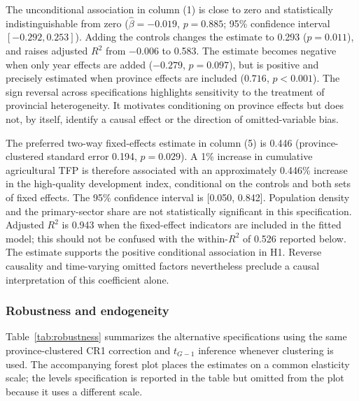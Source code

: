 \documentclass[sustainability,article,submit,moreauthors]{Definitions/mdpi}
\numberwithin{equation}{section}
\begin{document}


The unconditional association in column (1) is close to zero and statistically
indistinguishable from zero ($\hat\beta=-0.019$, $p=0.885$; 95\% confidence
interval $[-0.292,0.253]$). Adding the controls changes the
estimate to 0.293 ($p=0.011$), and raises adjusted
$R^2$ from $-0.006$ to 0.583. The estimate becomes negative when only year
effects are added ($-0.279$, $p=0.097$), but is positive and precisely
estimated when province effects are included ($0.716$, $p<0.001$).
The sign reversal across specifications highlights sensitivity to the
treatment of provincial heterogeneity. It motivates conditioning on
province effects but does not, by itself, identify a causal effect or the
direction of omitted-variable bias.

The preferred two-way fixed-effects estimate in column (5) is 0.446
(province-clustered standard error 0.194, $p=0.029$).
A 1\% increase in cumulative agricultural TFP is therefore associated
with an approximately 0.446\% increase in the high-quality development
index, conditional on the controls and both sets of fixed effects.
The 95\% confidence interval is [0.050, 0.842]. Population density and
the primary-sector share are not statistically significant in this
specification. Adjusted $R^2$ is 0.943 when the fixed-effect indicators
are included in the fitted model; this should not be confused with the
within-$R^2$ of 0.526 reported below.
The estimate supports the positive conditional association in H1.
Reverse causality and time-varying omitted factors nevertheless preclude
a causal interpretation of this coefficient alone.

\subsubsection{Robustness and endogeneity}

Table~\ref{tab:robustness} summarizes the alternative specifications using
the same province-clustered CR1 correction and $t_{G-1}$ inference whenever
clustering is used. The accompanying forest plot places the estimates on a
common elasticity scale; the levels specification is reported in the table
but omitted from the plot because it uses a different scale.
\end{document}
